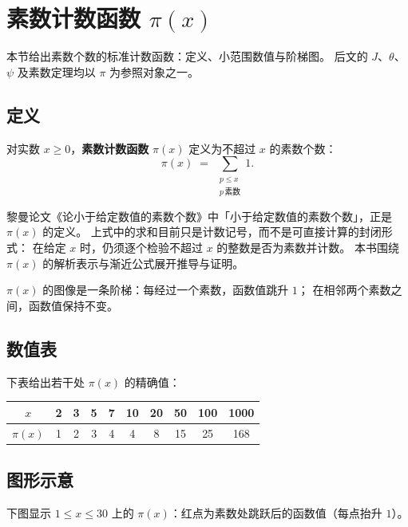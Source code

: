 \section{素数计数函数 \texorpdfstring{$\pi(x)$}{pi(x)}}\label{sec:prime_counting}

本节给出素数个数的标准计数函数：定义、小范围数值与阶梯图。
后文的 $J$、$\theta$、$\psi$ 及素数定理均以 $\pi$ 为参照对象之一。

\subsection{定义}
 
\begin{definition}{}{}
对实数 $x \geq 0$，\textbf{素数计数函数} $\pi(x)$ 定义为不超过 $x$ 的素数个数：
\[
  \pi(x) \;=\; \sum_{\substack{p \leq x \\ p\,\text{素数}}} 1.
\]
\end{definition}
 

黎曼论文《论小于给定数值的素数个数》中「小于给定数值的素数个数」，正是 $\pi(x)$ 的定义。
上式中的求和目前只是计数记号，而不是可直接计算的封闭形式：
在给定 $x$ 时，仍须逐个检验不超过 $x$ 的整数是否为素数并计数。
本书围绕 $\pi(x)$ 的解析表示与渐近公式展开推导与证明。

$\pi(x)$ 的图像是一条阶梯：每经过一个素数，函数值跳升 $1$；
在相邻两个素数之间，函数值保持不变。

\subsection{数值表}

下表给出若干处 $\pi(x)$ 的精确值：

\begin{center}
\begin{tabular}{cccccccccc}
\toprule
$x$ & 2 & 3 & 5 & 7 & 10 & 20 & 50 & 100 & 1000 \\
\midrule
$\pi(x)$ & 1 & 2 & 3 & 4 & 4 & 8 & 15 & 25 & 168 \\
\bottomrule
\end{tabular}
\end{center}

\subsection{图形示意}

下图显示 $1\le x\le 30$ 上的 $\pi(x)$：红点为素数处跳跃后的函数值（每点抬升 $1$）。

